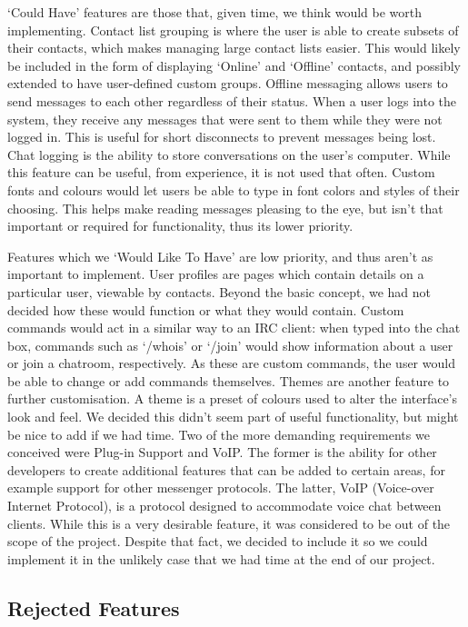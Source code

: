 `Could Have' features are those that, given time, we think would be worth implementing. Contact list grouping is where the user is able to create subsets of their contacts, which makes managing large contact lists easier. This would likely be included in the form of displaying `Online' and `Offline' contacts, and possibly extended to have user-defined custom groups. Offline messaging allows users to send messages to each other regardless of their status. When a user logs into the system, they receive any messages that were sent to them while they were not logged in. This is useful for short disconnects to prevent messages being lost. Chat logging is the ability to store conversations on the user's computer. While this feature can be useful, from experience, it is not used that often. Custom fonts and colours would let users be able to type in font colors and styles of their choosing. This helps make reading messages pleasing to the eye, but isn't that important or required for functionality, thus its lower priority.

Features which we `Would Like To Have' are low priority, and thus aren't as important to implement. User profiles are pages which contain details on a particular user, viewable by contacts. Beyond the basic concept, we had not decided how these would function or what they would contain. Custom commands would act in a similar way to an IRC client: when typed into the chat box, commands such as `/whois' or `/join' would show information about a user or join a chatroom, respectively. As these are custom commands, the user would be able to change or add commands themselves. Themes are another feature to further customisation. A theme is a preset of colours used to alter the interface's look and feel. We decided this didn't seem part of useful functionality, but might be nice to add if we had time. Two of the more demanding requirements we conceived were Plug-in Support and VoIP. The former is the ability for other developers to create additional features that can be added to certain areas, for example support for other messenger protocols. The latter, VoIP (Voice-over Internet Protocol), is a protocol designed to accommodate voice chat between clients. While this is a very desirable feature, it was considered to be out of the scope of the project. Despite that fact, we decided to include it so we could implement it in the unlikely case that we had time at the end of our project.


\subsection{Rejected Features}


